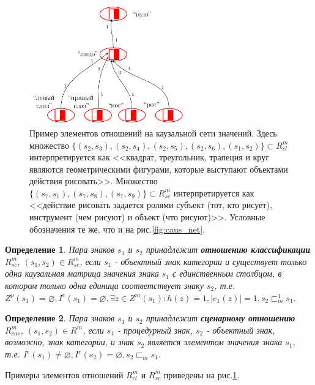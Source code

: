 \documentclass[12pt]{scrartcl}
\newtheorem{definition}{Определение}
\begin{document}
	\begin{figure}[H]
		\centering
		\includegraphics[width=0.6\textwidth,page=2]{examples/causnet/caus_net_colored}
		\caption{Пример элементов отношений на каузальной сети значений. Здесь множество $\{(s_2,s_3),(s_2,s_4),(s_2,s_5),(s_2,s_6),(s_1,s_2)\}\subset R_{cl}^m$ интерпретируется как <<квадрат, треугольник, трапеция и круг являются геометрическими фигурами, которые выступают объектами действия рисовать>>. Множество $\{(s_7,s_1),(s_7,s_8),(s_7,s_9)\}\subset R_{sc}^m$ интерпретируется как <<действие рисовать задается ролями субъект (тот, кто рисует), инструмент (чем рисуют) и объект (что рисуют)>>. Условные обозначения те же, что и на рис.\ref{fig:caus_net}.}
		\label{fig:signif_relat}		
	\end{figure}
	
	\begin{definition}
		Пара знаков $s_1$ и $s_2$ принадлежит \textbf{отношению классификации} $R_{sc}^m$, $(s_1,s_2)\in R_{sc}^m$, если $s_1$ - объектный знак категории и существует только одна каузальная матрица значения знака $s_1$ с единственным столбцом, в котором только одна единица соответствует знаку $s_2$, т.е. $Z^p(s_1)=\varnothing, I^e(s_1)=\varnothing, \exists z\in Z^m(s_1): h(z)=1, |e_1(z)|=1, s_2\sqsubset_m^1 s_1$.
	\end{definition}
	
	\begin{definition}
		Пара знаков $s_1$ и $s_2$ принадлежит \textbf{сценарному отношению} $R_{cas}^m$, $(s_1,s_2)\in R_{}^m$, если $s_1$ - процедурный знак, $s_2$ - объектный знак, возможно, знак категории, и знак $s_2$ является элементом значения знака $s_1$, т.е. $I^e(s_1)\not = \varnothing, I^e(s_2) = \varnothing, s_2\sqsubset_m s_1$.
	\end{definition}
	
	Примеры элементов отношений $R_{cl}^m$ и $R_{sc}^m$ приведены на рис.\ref{fig:signif_relat}.
	
\end{document}
